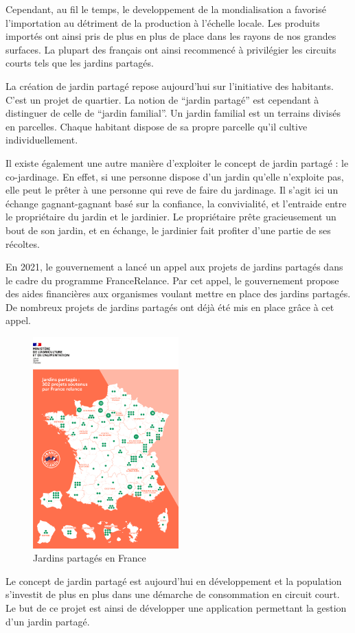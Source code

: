 \documentclass[french,a4paper]{article}
\begin{document}
Cependant, au fil le temps, le developpement de la mondialisation a favorisé l’importation au détriment de la production à l’échelle locale. Les produits importés ont ainsi pris de plus en plus de place dans les rayons de nos grandes surfaces. La plupart des français ont ainsi recommencé à privilégier les circuits courts tels que les jardins partagés. 

La création de jardin partagé repose aujourd’hui sur l’initiative des habitants. C’est un projet de quartier. La notion de “jardin partagé” est cependant à distinguer de celle de “jardin familial”.  Un jardin familial est un terrains divisés en parcelles. Chaque habitant dispose de sa propre parcelle qu’il cultive individuellement.

Il existe également une autre manière d’exploiter le concept de jardin partagé : le co-jardinage. En effet, si une personne dispose d’un jardin qu’elle n’exploite pas, elle peut le prêter à une personne qui reve de faire du jardinage. Il s’agit ici un échange gagnant-gagnant basé sur la confiance, la convivialité, et l'entraide entre le propriétaire du jardin et le jardinier. Le propriétaire prête gracieusement un bout de son jardin, et en échange, le jardinier fait profiter d'une partie de ses récoltes.

En 2021, le gouvernement a lancé un appel aux projets de jardins partagés dans le cadre du programme FranceRelance. Par cet appel, le gouvernement propose des aides financières aux organismes voulant mettre en place des jardins partagés. De nombreux projets de jardins partagés ont déjà été mis en place grâce à cet appel.
\begin{figure}[h]
    \centering
    \includegraphics[width=0.5\textwidth]{img/francerelance_carte.png}
    \caption{Jardins partagés en France}
\end{figure}
Le concept de jardin partagé est aujourd’hui en développement et la population s’investit de plus en plus dans une démarche de consommation en circuit court. Le but de ce projet est ainsi de développer une application permettant la gestion d’un jardin partagé. 
\end{document}
